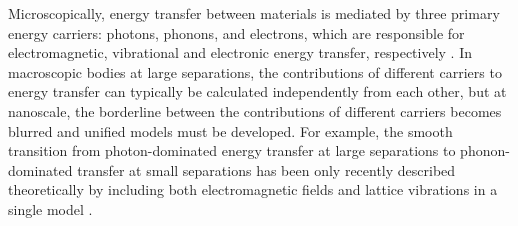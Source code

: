 
Microscopically, energy transfer between materials is mediated by three primary energy carriers: photons, phonons, and electrons, which are responsible for electromagnetic, vibrational and electronic energy transfer, respectively \cite{chen}. In macroscopic bodies at large separations, the contributions of different carriers to energy transfer can typically be calculated independently from each other, but at nanoscale, the borderline between the contributions of different carriers becomes blurred and unified models must be developed. For example, the smooth transition from photon-dominated energy transfer at large separations to phonon-dominated transfer at small separations has been only recently described theoretically by including both electromagnetic fields and lattice vibrations in a single model \cite{xiong14,chiloyan15}. 






